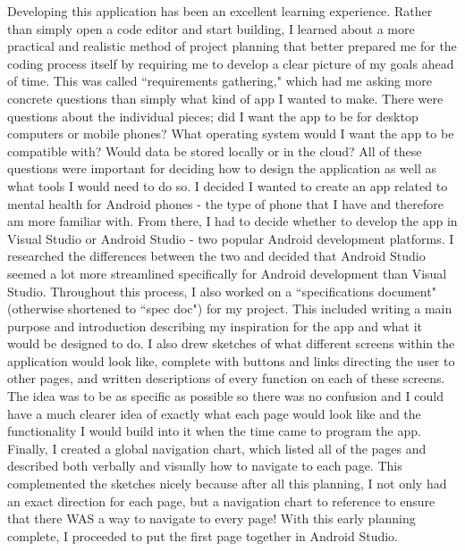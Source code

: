 \documentclass{article}
\begin{document}
Developing this application has been an excellent learning experience. Rather than simply open a code editor and start building, I learned about a more practical and realistic method of project planning that better prepared me for the coding process itself by requiring me to develop a clear picture of my goals ahead of time. This was called ``requirements gathering," which had me asking more concrete questions than simply what kind of app I wanted to make. There were questions about the individual pieces; did I want the app to be for desktop computers or mobile phones? What operating system would I want the app to be compatible with? Would data be stored locally or in the cloud? All of these questions were important for deciding how to design the application as well as what tools I would need to do so. I decided I wanted to create an app related to mental health for Android phones - the type of phone that I have and therefore am more familiar with. From there, I had to decide whether to develop the app in Visual Studio or Android Studio - two popular Android development platforms. I researched the differences between the two and decided that Android Studio seemed a lot more streamlined specifically for Android development than Visual Studio. Throughout this process, I also worked on a ``specifications document" (otherwise shortened to ``spec doc") for my project. This included writing a main purpose and introduction describing my inspiration for the app and what it would be designed to do. I also drew sketches of what different screens within the application would look like, complete with buttons and links directing the user to other pages, and written descriptions of every function on each of these screens. The idea was to be as specific as possible so there was no confusion and I could have a much clearer idea of exactly what each page would look like and the functionality I would build into it when the time came to program the app. Finally, I created a global navigation chart, which listed all of the pages and described both verbally and visually how to navigate to each page. This complemented the sketches nicely because after all this planning, I not only had an exact direction for each page, but a navigation chart to reference to ensure that there WAS a way to navigate to every page! With this early planning complete, I proceeded to put the first page together in Android Studio.
\end{document}
